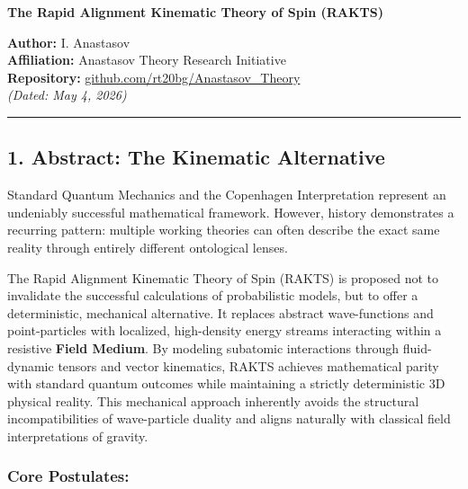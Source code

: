 \documentclass[
]{article}
\author{}
\date{}
\begin{document}
\textbf{The Rapid Alignment Kinematic Theory of Spin (RAKTS)}

\textbf{Author:} I. Anastasov\\
\textbf{Affiliation:} Anastasov Theory Research Initiative\\
\textbf{Repository:}
\href{https://github.com/rt20bg/Anastasov_Theory}{github.com/rt20bg/Anastasov\_Theory}\\
\emph{(Dated: May 4, 2026)}

\begin{center}\rule{0.5\linewidth}{0.5pt}\end{center}

\subsection{1. Abstract: The Kinematic
Alternative}\label{abstract-the-kinematic-alternative}

Standard Quantum Mechanics and the Copenhagen Interpretation represent
an undeniably successful mathematical framework. However, history
demonstrates a recurring pattern: multiple working theories can often
describe the exact same reality through entirely different ontological
lenses.

The Rapid Alignment Kinematic Theory of Spin (RAKTS) is proposed not to
invalidate the successful calculations of probabilistic models, but to
offer a deterministic, mechanical alternative. It replaces abstract
wave-functions and point-particles with localized, high-density energy
streams interacting within a resistive \textbf{Field Medium}. By
modeling subatomic interactions through fluid-dynamic tensors and vector
kinematics, RAKTS achieves mathematical parity with standard quantum
outcomes while maintaining a strictly deterministic 3D physical reality.
This mechanical approach inherently avoids the structural
incompatibilities of wave-particle duality and aligns naturally with
classical field interpretations of gravity.

\subsubsection{Core Postulates:}\label{core-postulates}
\end{document}
